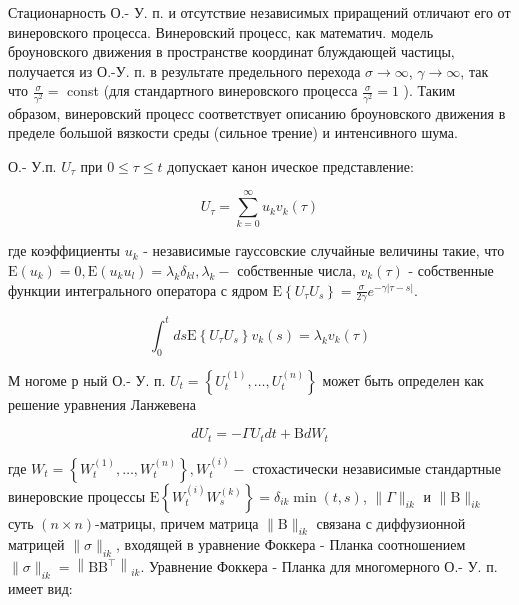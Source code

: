 \documentclass[10pt]{article}
\begin{document}
Стационарность О.- У. п. и отсутствие независимых приращений отличают его от винеровского процесса. Винеровский процесс, как математич. модель броуновского движения в пространстве координат блуждающей частицы, получается из О.-У. п. в результате предельного перехода $\sigma \rightarrow \infty$, $\gamma \rightarrow \infty$, так что $\frac{\sigma}{\gamma^{2}}=$ const (для стандартного винеровского процесса $\frac{\sigma}{\gamma^{2}}=1$ ). Таким образом, винеровский процесс соответствует описанию броуновского движения в пределе большой вязкости среды (сильное трение) и интенсивного шума.



О.- У.п. $U_{\tau}$ при $0 \leqslant \tau \leqslant t$ допускает канон ическое представление:



\[

U_{\tau}=\sum_{k=0}^{\infty} u_{k} v_{k}(\tau)

\]



где коэффициенты $u_{k}$ - независимые гауссовские случайные величины такие, что $\mathrm{E}\left(u_{k}\right)=0, \mathrm{E}\left(u_{k} u_{l}\right)=\lambda_{k} \delta_{k l}, \lambda_{k}-$ собственные числа, $v_{k}(\tau)$ - собственные функции интегрального оператора с ядром $\mathrm{E}\left\{U_{\tau} U_{s}\right\}=\frac{\sigma}{2 \gamma} e^{-\gamma|\tau-s|}$.



\[

\int_{0}^{t} d s \mathrm{E}\left\{U_{\tau} U_{s}\right\} v_{k}(s)=\lambda_{k} v_{k}(\tau)

\]



М ногоме р ный О.- У. п. $U_{t}=\left\{U_{t}^{(1)}, \ldots, U_{t}^{(n)}\right\}$ может быть определен как решение уравнения Ланжевена



\[

d U_{t}=-\Gamma U_{t} d t+\mathrm{B} d W_{t}

\]



где $W_{t}=\left\{W_{t}^{(1)}, \ldots, W_{t}^{(n)}\right\}, W_{t}^{(i)}-$ стохастически независимые стандартные винеровские процессы $\mathrm{E}\left\{W_{t}^{(i)} W_{s}^{(k)}\right\}=\delta_{i k} \min (t, s)$, $\|\Gamma\|_{i k}$ и $\|\mathrm{B}\|_{i k}$ суть $(n \times n)$-матрицы, причем матрица $\|\mathrm{B}\|_{i k}$ связана с диффузионной матрицей $\|\sigma\|_{i k}$, входящей в уравнение Фоккера - Планка соотношением $\|\sigma\|_{i k}=\left\|\mathrm{BB}^{\top}\right\|_{i k}$. Уравнение Фоккера - Планка для многомерного О.- У. п. имеет вид:
\end{document}
